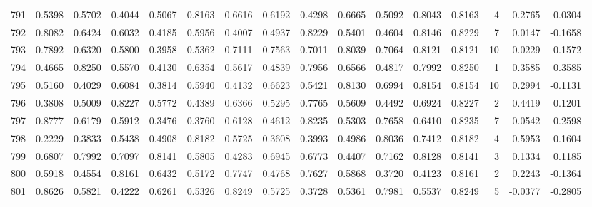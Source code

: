\begin{tabular}{lrrrrrrrrrrrrrrr}
791 &      0.5398 &  0.5702 &  0.4044 &  0.5067 &  0.8163 &  0.6616 &  0.6192 &  0.4298 &  0.6665 &  0.5092 &   0.8043 &     0.8163 &      4 &                    0.2765 &                     0.0304 \\
792 &      0.8082 &  0.6424 &  0.6032 &  0.4185 &  0.5956 &  0.4007 &  0.4937 &  0.8229 &  0.5401 &  0.4604 &   0.8146 &     0.8229 &      7 &                    0.0147 &                    -0.1658 \\
793 &      0.7892 &  0.6320 &  0.5800 &  0.3958 &  0.5362 &  0.7111 &  0.7563 &  0.7011 &  0.8039 &  0.7064 &   0.8121 &     0.8121 &     10 &                    0.0229 &                    -0.1572 \\
794 &      0.4665 &  0.8250 &  0.5570 &  0.4130 &  0.6354 &  0.5617 &  0.4839 &  0.7956 &  0.6566 &  0.4817 &   0.7992 &     0.8250 &      1 &                    0.3585 &                     0.3585 \\
795 &      0.5160 &  0.4029 &  0.6084 &  0.3814 &  0.5940 &  0.4132 &  0.6623 &  0.5421 &  0.8130 &  0.6994 &   0.8154 &     0.8154 &     10 &                    0.2994 &                    -0.1131 \\
796 &      0.3808 &  0.5009 &  0.8227 &  0.5772 &  0.4389 &  0.6366 &  0.5295 &  0.7765 &  0.5609 &  0.4492 &   0.6924 &     0.8227 &      2 &                    0.4419 &                     0.1201 \\
797 &      0.8777 &  0.6179 &  0.5912 &  0.3476 &  0.3760 &  0.6128 &  0.4612 &  0.8235 &  0.5303 &  0.7658 &   0.6410 &     0.8235 &      7 &                   -0.0542 &                    -0.2598 \\
798 &      0.2229 &  0.3833 &  0.5438 &  0.4908 &  0.8182 &  0.5725 &  0.3608 &  0.3993 &  0.4986 &  0.8036 &   0.7412 &     0.8182 &      4 &                    0.5953 &                     0.1604 \\
799 &      0.6807 &  0.7992 &  0.7097 &  0.8141 &  0.5805 &  0.4283 &  0.6945 &  0.6773 &  0.4407 &  0.7162 &   0.8128 &     0.8141 &      3 &                    0.1334 &                     0.1185 \\
800 &      0.5918 &  0.4554 &  0.8161 &  0.6432 &  0.5172 &  0.7747 &  0.4768 &  0.7627 &  0.5868 &  0.3720 &   0.4123 &     0.8161 &      2 &                    0.2243 &                    -0.1364 \\
801 &      0.8626 &  0.5821 &  0.4222 &  0.6261 &  0.5326 &  0.8249 &  0.5725 &  0.3728 &  0.5361 &  0.7981 &   0.5537 &     0.8249 &      5 &                   -0.0377 &                    -0.2805 \\

\end{tabular}
